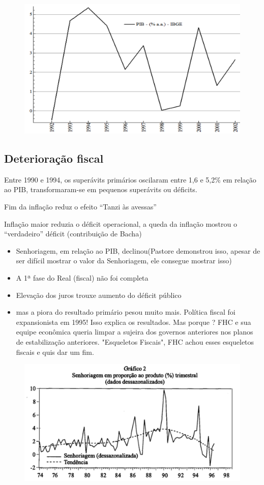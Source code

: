 \documentclass[a4paper,12pt]{article}[abntex2]
\begin{document}
\begin{figure}[H]
    \centering
    \includegraphics[width=0.7\linewidth]{Imagens/a14i7.png}
\end{figure}

\subsection{\textbf{Deterioração fiscal}}
Entre 1990 e 1994, os superávits primários oscilaram entre 1,6 e 5,2\% em relação ao PIB, transformaram-se em pequenos superávits ou déficits. 

Fim da inflação reduz o efeito “Tanzi às avessas” 

Inflação maior reduzia o déficit operacional, a queda da inflação mostrou o “verdadeiro” déficit (contribuição de Bacha)\begin{itemize}
    \item Senhoriagem, em relação ao PIB, declinou(Pastore demonstrou isso, apesar de ser difícil mostrar o valor da Senhoriagem, ele consegue mostrar isso)
    \item A 1ª fase do Real (fiscal) não foi completa
    \item Elevação dos juros trouxe aumento do déficit público 
    \item mas a piora do resultado primário pesou muito mais. Política fiscal foi expansionista em 1995! Isso explica os resultados. Mas porque ? FHC e sua equipe econômica queria limpar a sujeira dos governos anteriores nos planos de estabilização anteriores. "Esqueletos Fiscais", FHC achou esses esqueletos fiscais e quis dar um fim.
\end{itemize}

\begin{figure}[H]
    \centering
    \includegraphics[width=0.7\linewidth]{Imagens/a14i8.png}
\end{figure}
\end{document}
